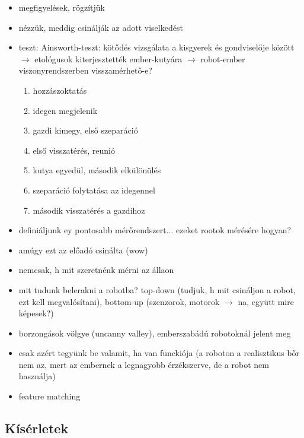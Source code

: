 \documentclass[a4paper, 11pt]{article}
\begin{document}
\begin{itemize}
	\item megfigyelések, rögzítjük
	\item nézzük, meddig csinálják az adott viselkedést
	\item teszt: Ainsworth-teszt: kötődés vizsgálata a kisgyerek és gondviselője között $\to$ etológusok kiterjesztették ember-kutyára $\to$ robot-ember viszonyrendszerben visszamérhető-e?
	\begin{enumerate}
		\item hozzászoktatás
		\item idegen megjelenik
		\item gazdi kimegy, első szeparáció
		\item első visszatérés, reunió
		\item kutya egyedül, második elkülönülés
		\item szeparáció folytatása az idegennel
		\item második visszatérés a gazdihoz
	\end{enumerate}
	\item definiáljunk ey pontosabb mérőrendszert... ezeket rootok mérésére hogyan?
	\item amúgy ezt az előadó csinálta (wow)
	\item nemcsak, h mit szeretnénk mérni az állaon
	\item mit tudunk belerakni a robotba? top-down (tudjuk, h mit csináljon a robot, ezt kell megvalósítani), bottom-up (szenzorok, motorok $\to$ na, együtt mire képesek?) 
	\item borzongások völgye (uncanny valley), emberszabádú robotoknál jelent meg
	\item csak azért tegyünk be valamit, ha van funckiója (a roboton a realisztikus bőr nem az, mert az embernek a legnagyobb érzékszerve, de a robot nem használja)
	\item feature matching
\end{itemize}

\subsection{Kísérletek}
\end{document}
